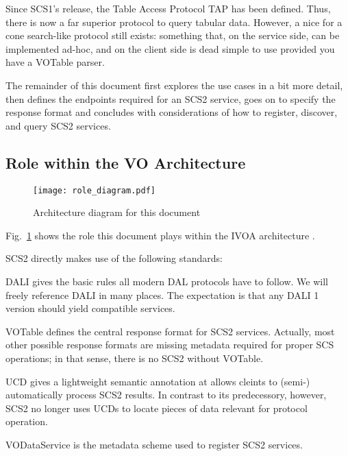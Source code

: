 \documentclass[11pt,a4paper]{ivoa}
\begin{document}
Since SCS1's release, the Table Access Protocol TAP
\citep{2019ivoa.spec.0927D} has been defined.  Thus, there is now a far
superior protocol to query tabular data.  However, a nice for a cone
search-like protocol still exists: something that, on the service side,
can be implemented ad-hoc, and on the client side is dead simple to use
provided you have a VOTable parser.

The remainder of this document first explores the use cases in a bit
more detail, then defines the endpoints required for an SCS2 service,
goes on to specify the response format and concludes with considerations
of how to register, discover, and query SCS2 services.

\subsection{Role within the VO Architecture}

\begin{figure}
\centering


\texttt{[image: role\_diagram.pdf]}
\caption{Architecture diagram for this document}
\label{fig:archdiag}
\end{figure}

Fig.~\ref{fig:archdiag} shows the role this document plays within the
IVOA architecture \citep{2021ivoa.spec.1101D}.

SCS2 directly makes use of the following standards:

\begin{longdescription}
\item[DALI] \citet{2017ivoa.spec.0517D} gives the basic rules all modern
DAL protocols have to follow.  We will freely reference DALI in many
places.  The expectation is that any DALI 1 version should yield
compatible services.

\item[VOTable] \citet{2025ivoa.spec.0116O} defines the central response
format for SCS2 services.  Actually, most other possible response
formats are missing metadata required for proper SCS operations; in that
sense, there is no SCS2 without VOTable.

\item[UCD] \citet{2005ivoa.spec.0819D} gives a lightweight semantic
annotation at allows cleints to (semi-) automatically process SCS2
results.  In contrast to its predecessory, however, SCS2 no longer uses
UCDs to locate pieces of data relevant for protocol operation.

\item[VODataService] \citet{2021ivoa.spec.1102D} is the metadata scheme
used to register SCS2 services.

\end{longdescription}
\end{document}
